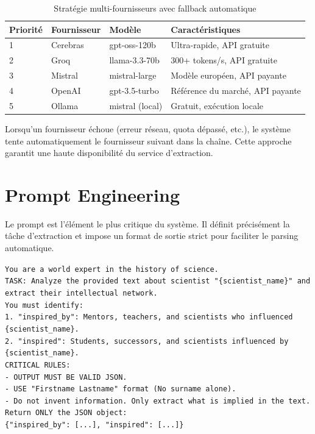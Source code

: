 \documentclass[12pt,a4paper]{report}
\begin{document}
\begin{table}[H]
\centering
\begin{tabular}{|l|l|l|l|}
\hline
\rowcolor{ice500!20}
\textbf{Priorité} & \textbf{Fournisseur} & \textbf{Modèle} & \textbf{Caractéristiques} \\
\hline
1 & Cerebras & gpt-oss-120b & Ultra-rapide, API gratuite \\
\hline
2 & Groq & llama-3.3-70b & 300+ tokens/s, API gratuite \\
\hline
3 & Mistral & mistral-large & Modèle européen, API payante \\
\hline
4 & OpenAI & gpt-3.5-turbo & Référence du marché, API payante \\
\hline
5 & Ollama & mistral (local) & Gratuit, exécution locale \\
\hline
\end{tabular}
\caption{Stratégie multi-fournisseurs avec fallback automatique}
\end{table}

Lorsqu'un fournisseur échoue (erreur réseau, quota dépassé, etc.), le système tente automatiquement le fournisseur suivant dans la chaîne. Cette approche garantit une haute disponibilité du service d'extraction.

\section{Prompt Engineering}

Le prompt est l'élément le plus critique du système. Il définit précisément la tâche d'extraction et impose un format de sortie strict pour faciliter le parsing automatique.

\begin{infobox}
\small
\texttt{You are a world expert in the history of science.}\\[0.3em]
\texttt{TASK: Analyze the provided text about scientist "\{scientist\_name\}" and extract their intellectual network.}\\[0.3em]
\texttt{You must identify:}\\
\texttt{1. "inspired\_by": Mentors, teachers, and scientists who influenced \{scientist\_name\}.}\\
\texttt{2. "inspired": Students, successors, and scientists influenced by \{scientist\_name\}.}\\[0.3em]
\texttt{CRITICAL RULES:}\\
\texttt{- OUTPUT MUST BE VALID JSON.}\\
\texttt{- USE "Firstname Lastname" format (No surname alone).}\\
\texttt{- Do not invent information. Only extract what is implied in the text.}\\[0.3em]
\texttt{Return ONLY the JSON object:}\\
\texttt{\{"inspired\_by": [...], "inspired": [...]\}}
\end{infobox}
\end{document}
